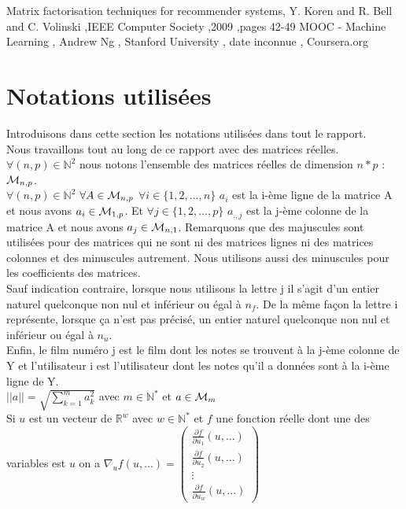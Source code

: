 \documentclass[a4paper,10pt]{article}
\begin{document}
\begin{thebibliography}{99} 
 Matrix factorisation techniques for recommender systems, Y. Koren and R. Bell and C. Volinski ,IEEE Computer Society ,2009 ,pages 42-49 
 MOOC - Machine Learning , Andrew Ng , Stanford University , date inconnue , Coursera.org
\end{thebibliography}

\newpage

\appendix
\section{Notations utilisées}
\label{notations}

Introduisons dans cette section les notations utilisées dans tout le rapport.\\ 

Nous travaillons tout au long de ce rapport avec des matrices réelles. $\forall (n, p) \in \mathbb{N}^2$ nous notons l'ensemble des matrices réelles de dimension $n * p$ : ${\cal M}_{n, p}$.\\ 
$\forall (n, p) \in \mathbb{N}^2$ $\forall A \in {\cal M}_{n, p}$ $\forall i \in \{1, 2, ..., n\}$ $a_i$ est la i-ème ligne de la matrice A et nous avons $a_i \in {\cal M}_{1, p}$. Et $\forall j \in \{1, 2, ..., p\}$ $a_{., j}$ est la j-ème colonne de la matrice A et nous avons $a_j \in {\cal M}_{n, 1}$. Remarquons que des majuscules sont utilisées pour des matrices qui ne sont ni des matrices lignes ni des matrices colonnes et des minuscules autrement. Nous utilisons aussi des minuscules pour les coefficients des matrices.\\ 
Sauf indication contraire, lorsque nous utilisons la lettre j il s'agit d'un entier naturel quelconque non nul et inférieur ou égal à $n_f$. De la même façon la lettre i représente, lorsque ça n'est pas précisé, un entier naturel quelconque non nul et inférieur ou égal à $n_u$.\\ 
Enfin, le film numéro j est le film dont les notes se trouvent à la j-ème colonne de Y et l'utilisateur i est l'utilisateur dont les notes qu'il a données sont à la i-ème ligne de Y.\\

$||a|| = \sqrt{\sum_{k = 1}^{m} a_{k}^{2}}$ avec $m \in \mathbb{N}^*$ et $a \in {\cal M}_{m}$\\

Si $u$ est un vecteur de $\mathbb{R}^w$ avec $w \in \mathbb{N}^*$ et $f$ une fonction réelle dont une des variables est $u$ on a 
$\nabla_{u} f(u, ...) =
\begin{pmatrix}
\frac{\partial f}{\partial u_{1}}(u, ...)\\
\frac{\partial f}{\partial u_{2}}(u, ...)\\
\vdots\\
\frac{\partial f}{\partial u_{w}}(u, ...)
\end{pmatrix}$
\end{document}
